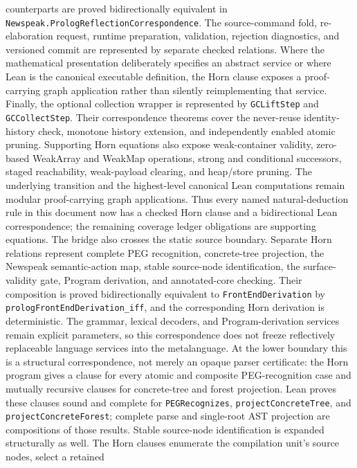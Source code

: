 \documentclass[11pt]{article}
\numberwithin{equation}{section}
\begin{document}
counterparts are proved bidirectionally equivalent in
\texttt{Newspeak.PrologReflectionCorrespondence}.  The source-command fold,
re-elaboration request, runtime preparation, validation, rejection diagnostics,
and versioned commit are represented by separate checked relations.  Where the
mathematical presentation deliberately specifies an abstract service or where
Lean is the canonical executable definition, the Horn clause exposes a
proof-carrying graph application rather than silently reimplementing that
service.
Finally, the optional collection wrapper is represented by
\texttt{GCLiftStep} and \texttt{GCCollectStep}.  Their correspondence theorems
cover the never-reuse identity-history check, monotone history extension, and
independently enabled atomic pruning.  Supporting Horn equations also expose
weak-container validity, zero-based WeakArray and WeakMap operations, strong
and conditional successors, staged reachability, weak-payload clearing, and
heap/store pruning.  The underlying transition and the highest-level canonical
Lean computations remain modular proof-carrying graph applications.
Thus every named natural-deduction rule in this document now has a checked
Horn clause and a bidirectional Lean correspondence; the remaining coverage
ledger obligations are supporting equations.
The bridge also crosses the static source boundary.  Separate Horn relations
represent complete PEG recognition, concrete-tree projection, the Newspeak
semantic-action map, stable source-node identification, the surface-validity
gate, Program derivation, and annotated-core checking.  Their composition is
proved bidirectionally equivalent to
\texttt{FrontEndDerivation} by
\texttt{prologFrontEnd}\allowbreak\texttt{Derivation\_iff}, and the
corresponding Horn derivation
is deterministic.  The grammar, lexical decoders, and Program-derivation
services remain explicit parameters, so this correspondence does not freeze
reflectively replaceable language services into the metalanguage.
At the lower boundary this is a structural correspondence, not merely an
opaque parser certificate: the Horn program gives a clause for every atomic
and composite PEG-recognition case and mutually recursive clauses for
concrete-tree and forest projection.  Lean proves these clauses sound and
complete for \texttt{PEGRecognizes}, \texttt{projectConcreteTree}, and
\texttt{projectConcreteForest}; complete parse and single-root AST projection
are compositions of those results.
Stable source-node identification is expanded structurally as well.  The Horn
clauses enumerate the compilation unit's source nodes, select a retained
\end{document}
